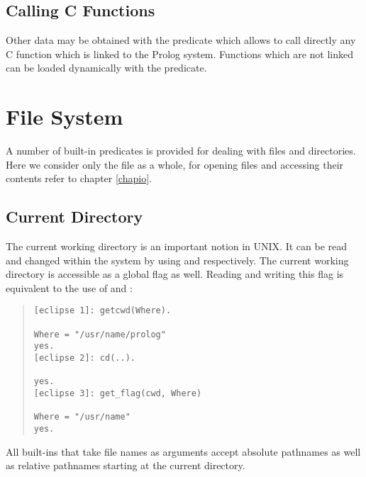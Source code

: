 \subsection{Calling C Functions}
Other data may be obtained with the predicate 
which allows to call directly any C function which is
linked to the Prolog system.
Functions which are not linked can be loaded dynamically with the
 predicate.


\section{File System}
A number of built-in predicates is provided for dealing with files and
directories.
Here we consider only the file as a whole, for opening files and accessing
their contents refer to chapter \ref{chapio}.

\subsection{Current Directory}
The current working directory is an important notion in UNIX.
It can be read and changed within the {\eclipse} system by using  and
 respectively.
The current working directory is accessible as a global flag as well.
Reading and writing this flag is equivalent to the use of  and
:
\begin{quote}\begin{verbatim}
[eclipse 1]: getcwd(Where).

Where = "/usr/name/prolog"
yes.
[eclipse 2]: cd(..).

yes.
[eclipse 3]: get_flag(cwd, Where)

Where = "/usr/name"
yes.
\end{verbatim}\end{quote}
All {\eclipse} built-ins that take file names as arguments accept absolute
pathnames as well as relative pathnames starting at the current directory.

